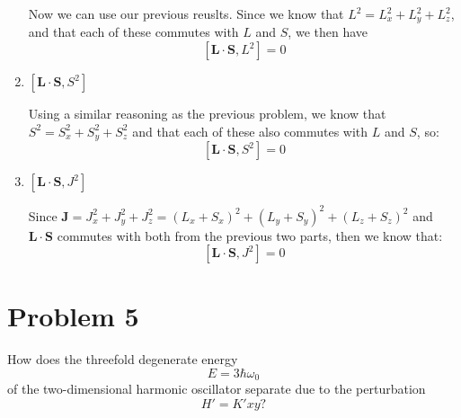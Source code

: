 \documentclass[10pt]{article}
\begin{document}
\begin{enumerate}[label=\alph*)]
			\begin{solution}
				Now we can use our previous reuslts. Since we know that $L^2 = L_x^2 + L_y^2 + L_z^2$, and that each of these commutes with $L$ and $S$, we then have
				\[ [\mathbf{L \cdot S}, L^2]  =0\]
			\end{solution}
			\item $[\mathbf {L \cdot S}, S^2]$
			
			\begin{solution}
				Using a similar reasoning as the previous problem, we know that $S^2 = S_x^2 + S_y^2 + S_z^2$ and that each of these also commutes with $L$ and $S$, so: 
				\[ [\mathbf{L \cdot S}, S^2] = 0\]
			\end{solution}
			\item $[\mathbf{L \cdot S}, J^2]$
			
			\begin{solution}
				Since $\mathbf J = J_x^2 + J_y^2 + J_z^2 = (L_x + S_x)^2 + (L_y + S_y)^2 + (L_z + S_z)^2$ and $\mathbf{L \cdot S}$ commutes with both from the previous two parts, then we know that:
				\[ [\mathbf{L \cdot S}, J^2] = 0\]
			\end{solution}
	\end{enumerate}

		\pagebreak

	\section*{Problem 5}
	How does the threefold degenerate energy 
	\[ E = 3\hbar \omega_0\]
	of the two-dimensional harmonic oscillator separate due to the perturbation 
	\[ H' = K'xy?\]
\end{document}
